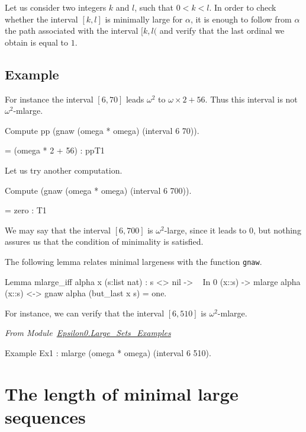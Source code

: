 \documentclass[a4paper]{book}
\begin{document}
Let us consider two integers $k$ and $l$, such that $0<k<l$. In order to check whether the interval $[k,l]$ is minimally large for $\alpha$, it is enough to
follow from $\alpha$ the path associated with the interval $[k,l($ and verify that the last ordinal we obtain is equal to $1$.
 
\subsection{Example}

For instance the interval $[6,70]$ leads $\omega^2$ to $\omega\times 2 + 56$. Thus this interval is not $\omega^2$-mlarge.


\begin{Coqsrc}
Compute pp (gnaw (omega * omega) (interval 6 70)).
\end{Coqsrc}

\begin{Coqanswer}
 = (omega * 2 + 56)%
     : ppT1
\end{Coqanswer}

Let us try another computation.

\begin{Coqsrc}
Compute (gnaw (omega * omega) (interval 6 700)).
\end{Coqsrc}

\begin{Coqanswer}
 = zero : T1
\end{Coqanswer}

We may say that the interval $[6,700]$ is $\omega^2$-large, since it leads to $0$, but nothing assures us that the condition of minimality is satisfied.

The following lemma relates minimal largeness with the function 
\texttt{gnaw}. 

\begin{Coqsrc}
Lemma mlarge_iff alpha x (s:list nat) :
  s <> nil -> ~ In 0 (x::s) ->
  mlarge alpha (x::s) <-> gnaw alpha (but_last x s) = one.
 \end{Coqsrc}


For instance, we can verify that the interval $[6,510]$ is $\omega^2$-mlarge.

 \noindent
\emph{From Module~\href{../src/html/hydras.Epsilon0.Large_Sets_Examples.html}{Epsilon0.Large\_Sets\_Examples}}
\begin{Coqsrc}
Example Ex1 : mlarge (omega * omega) (interval 6 510).
\end{Coqsrc}


\section{The length of minimal large sequences}
\end{document}
